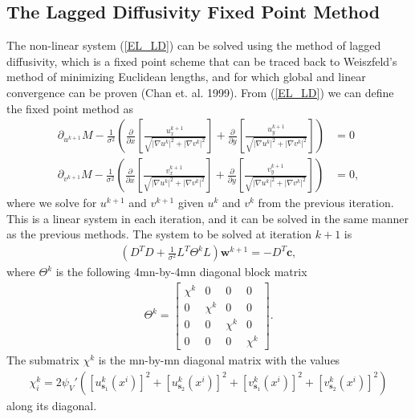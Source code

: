 \subsection{The Lagged Diffusivity Fixed Point Method}
The non-linear system (\ref{EL_LD}) can be solved using the method of lagged diffusivity, which is a fixed point scheme that can be traced back to Weiszfeld's method of minimizing Euclidean lengths, and for which global and linear convergence can be proven (Chan et. al. 1999). From (\ref{EL_LD}) we can define the fixed point method as
\begin{align*}
\partial_{u^{k+1}} M - \frac{1}{\sigma^2} \left(\frac{\partial}{\partial x}\left[ \frac{u^{k+1}_x}{\sqrt{|\nabla u^k|^2 + |\nabla v^k|^2}} \right] + \frac{\partial}{\partial y} \left[ \frac{u^{k+1}_y}{\sqrt{|\nabla u^k|^2 + |\nabla v^k|^2}} \right] \right) &= 0 \\
\partial_{v^{k+1}} M - \frac{1}{\sigma^2} \left(\frac{\partial}{\partial x}\left[ \frac{v^{k+1}_x}{\sqrt{|\nabla u^k|^2 + |\nabla v^k|^2}} \right] + \frac{\partial}{\partial y} \left[ \frac{v^{k+1}_y}{\sqrt{|\nabla u^k|^2 + |\nabla v^k|^2}} \right] \right) &= 0,
\end{align*}
where we solve for $u^{k+1}$ and $v^{k+1}$ given $u^k$ and $v^k$ from the previous iteration. This is a linear system in each iteration, and it can be solved in the same manner as the previous methods. The system to be solved at iteration $k+1$ is
\begin{align*}
(D^T D + \frac{1}{\sigma^2} L^T\Theta^{k}L) \textbf{w}^{k+1} = - D^T \textbf{c},
\end{align*}
where $\Theta^k$ is the following 4mn-by-4mn diagonal block matrix
\begin{align*}
\Theta^k = \left[
\begin{array}{c|c|c|c}
\chi^k & 0 & 0 & 0 \\ \hline
0 & \chi^k & 0 & 0 \\ \hline
0 & 0 & \chi^k & 0 \\ \hline
0 & 0 & 0 & \chi^k
\end{array}
\right].
\end{align*}
The submatrix $\chi^k$ is the mn-by-mn diagonal matrix with the values 
\begin{align*}
\chi^k_i = 2 \psi_V'\left( \left[u^k_{\textbf{s}_1}(x^i)\right]^2 + \left[u^k_{\textbf{s}_2}(x^i)\right]^2 + \left[v^k_{\textbf{s}_1}(x^i)\right]^2 + \left[v^k_{\textbf{s}_2}(x^i)\right]^2 \right)
\end{align*}
along its diagonal.